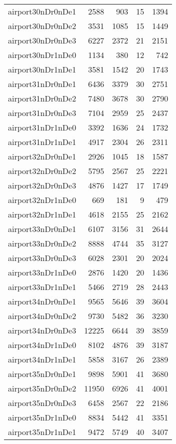 \begin{longtable}{lrrrr}
airport30nDr0nDe1 & 2588 & 903 & 15 & 1394 \\
airport30nDr0nDe2 & 3531 & 1085 & 15 & 1449 \\
airport30nDr0nDe3 & 6227 & 2372 & 21 & 2151 \\
airport30nDr1nDe0 & 1134 & 380 & 12 & 742 \\
airport30nDr1nDe1 & 3581 & 1542 & 20 & 1743 \\
airport31nDr0nDe1 & 6436 & 3379 & 30 & 2751 \\
airport31nDr0nDe2 & 7480 & 3678 & 30 & 2790 \\
airport31nDr0nDe3 & 7104 & 2959 & 25 & 2437 \\
airport31nDr1nDe0 & 3392 & 1636 & 24 & 1732 \\
airport31nDr1nDe1 & 4917 & 2304 & 26 & 2311 \\
airport32nDr0nDe1 & 2926 & 1045 & 18 & 1587 \\
airport32nDr0nDe2 & 5795 & 2567 & 25 & 2221 \\
airport32nDr0nDe3 & 4876 & 1427 & 17 & 1749 \\
airport32nDr1nDe0 & 669 & 181 & 9 & 479 \\
airport32nDr1nDe1 & 4618 & 2155 & 25 & 2162 \\
airport33nDr0nDe1 & 6107 & 3156 & 31 & 2644 \\
airport33nDr0nDe2 & 8888 & 4744 & 35 & 3127 \\
airport33nDr0nDe3 & 6028 & 2301 & 20 & 2024 \\
airport33nDr1nDe0 & 2876 & 1420 & 20 & 1436 \\
airport33nDr1nDe1 & 5466 & 2719 & 28 & 2443 \\
airport34nDr0nDe1 & 9565 & 5646 & 39 & 3604 \\
airport34nDr0nDe2 & 9730 & 5482 & 36 & 3230 \\
airport34nDr0nDe3 & 12225 & 6644 & 39 & 3859 \\
airport34nDr1nDe0 & 8102 & 4876 & 39 & 3187 \\
airport34nDr1nDe1 & 5858 & 3167 & 26 & 2389 \\
airport35nDr0nDe1 & 9898 & 5901 & 41 & 3680 \\
airport35nDr0nDe2 & 11950 & 6926 & 41 & 4001 \\
airport35nDr0nDe3 & 6458 & 2567 & 22 & 2186 \\
airport35nDr1nDe0 & 8834 & 5442 & 41 & 3351 \\
airport35nDr1nDe1 & 9472 & 5749 & 40 & 3407 \\

\end{longtable}
